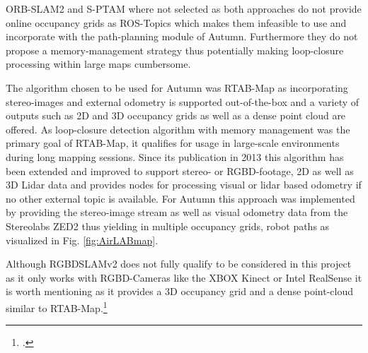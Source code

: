 ORB-SLAM2 and S-PTAM where not selected as both approaches do not provide online occupancy grids as ROS-Topics which makes them infeasible to use and incorporate with the path-planning module of Autumn. Furthermore they do not propose a memory-management strategy thus potentially making loop-closure processing within large maps cumbersome. 

The algorithm chosen to be used for Autumn was RTAB-Map as incorporating stereo-images and external odometry is supported out-of-the-box and a variety of outputs such as 2D and 3D occupancy grids as well as a dense point cloud are offered. 
As loop-closure detection algorithm with memory management was the primary goal of RTAB-Map, it qualifies for usage in large-scale environments during long mapping sessions.
Since its publication in 2013 this algorithm has been extended and improved to support stereo- or RGBD-footage, 2D as well as 3D Lidar data and provides nodes for processing visual or lidar based odometry if no other external topic is available. 
For Autumn this approach was implemented by providing the stereo-image stream as well as visual odometry data from the Stereolabs ZED2 thus yielding in multiple occupancy grids, robot paths as visualized in Fig. \ref{fig:AirLABmap}.

Although RGBDSLAMv2 does not fully qualify to be considered in this project as it only works with RGBD-Cameras like the XBOX Kinect or Intel RealSense it is worth mentioning as it provides a 3D occupancy grid and a dense point-cloud similar to RTAB-Map.\footcite{labbe2019rtab}

